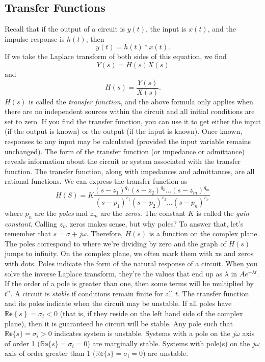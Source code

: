 \documentclass[nobib]{tufte-handout}
\begin{document}
\subsection{Transfer Functions}

Recall that if the output of a circuit 
is $y(t)$, the input is $x(t)$, and the 
impulse response is $h(t)$, then 
\[y(t) = h(t)*x(t).\]
If we take the Laplace transform of 
both sides of this equation, we find 
\[Y(s) = H(s)X(s)\]
and 
\[H(s) = \frac{Y(s)}{X(s)}.\]
$H(s)$ is called the \emph{transfer function}, 
and the above formula only applies 
when there are no independent sources 
within the circuit and all initial 
conditions are set to zero. If you 
find the transfer function, you 
can use it to get either the input (if 
the output is known) or the output (if 
the input is known).
Once known, responses to any input may be calculated
(provided the input variable remains unchanged).
The form of the transfer function (or impedance or
admittance) reveals information about the circuit or
system associated with the transfer function.
The transfer function,
along with impedances and admittances, 
are all rational functions. We can express 
the transfer function as 
\begin{equation}
    H(S) = K\frac{(s-z_1)^{q_1}(s-z_2)^{q_2} \dots (s-z_m)^{q_m}}{(s-p_1)^{r_1}(s-p_2)^{r_2} \dots (s-p_n)^{r_n}}
\end{equation}
where $p_n$ are the \emph{poles} and 
$z_m$ are the \emph{zeros}. The constant 
$K$ is called the \emph{gain constant}. 
Calling $z_m$ zeros makes sense, but why 
poles? To answer that, let's remember that 
$s = \sigma + j\omega$. Therefore, $H(s)$ 
is a function on the complex plane. The poles 
correspond to where we're dividing by zero and 
the graph of $H(s)$ jumps to infinity. 
On the complex plane, we often mark them with xs
and zeros with dots. 
Poles indicate the form of the natural response of a circuit.
When you solve the inverse Laplace transform,
they're the values that end up as $\lambda$ 
in $Ae^{-\lambda t}$. If the order of a pole is 
greater than one, then some terms will be 
multiplied by $t^n$. 
A circuit is \emph{stable} if conditions 
remain finite for all $t$. The transfer function 
and its poles indicate when the circuit may 
be unstable. If all poles have $\mathbb{Re}\left\{s\right\} = \sigma_i < 0$
(that is, if they reside on the left hand side of the complex plane), 
then it is guaranteed he circuit will be stable. 
Any pole such that $\mathbb{Re}\{s\} = \sigma_i > 0$ indicates system is
unstable. Systems with a pole on the $j\omega$ axis of order 1
($\mathbb{Re}\{s\} = \sigma_i = 0$) are marginally stable.
Systems with pole(s) on the $j\omega$ axis of order greater
than 1 ($\mathbb{Re}\{s\} = \sigma_i = 0$) are unstable.
\end{document}
